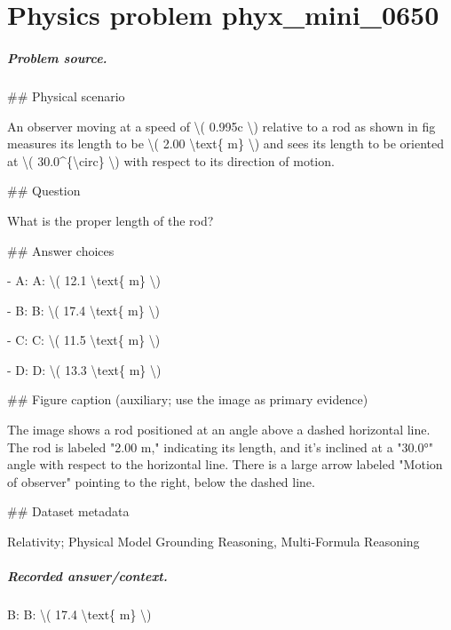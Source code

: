 
\chapter{Physics problem phyx\_mini\_0650}
\label{ch:PhyXMiniProblems_problem_phyx_mini_0650}

\paragraph{Problem source.}
\#\# Physical scenario

An observer moving at a speed of \textbackslash{}( 0.995c \textbackslash{}) relative to a rod as shown in fig measures its length to be \textbackslash{}( 2.00 \textbackslash{}text\{ m\} \textbackslash{}) and sees its length to be oriented at \textbackslash{}( 30.0\textasciicircum{}\{\textbackslash{}circ\} \textbackslash{}) with respect to its direction of motion.

\#\# Question

What is the proper length of the rod?

\#\# Answer choices

- A: A: \textbackslash{}( 12.1 \textbackslash{}text\{ m\} \textbackslash{})

- B: B: \textbackslash{}( 17.4 \textbackslash{}text\{ m\} \textbackslash{})

- C: C: \textbackslash{}( 11.5 \textbackslash{}text\{ m\} \textbackslash{})

- D: D: \textbackslash{}( 13.3 \textbackslash{}text\{ m\} \textbackslash{})

\#\# Figure caption (auxiliary; use the image as primary evidence)

The image shows a rod positioned at an angle above a dashed horizontal line. The rod is labeled "2.00 m," indicating its length, and it's inclined at a "30.0°" angle with respect to the horizontal line. There is a large arrow labeled "Motion of observer" pointing to the right, below the dashed line.

\#\# Dataset metadata

Relativity; Physical Model Grounding Reasoning, Multi-Formula Reasoning

\paragraph{Recorded answer/context.}
B: B: \textbackslash{}( 17.4 \textbackslash{}text\{ m\} \textbackslash{})

